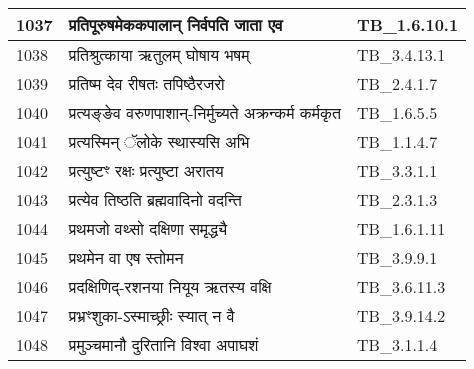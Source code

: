 \documentclass[17pt]{extarticle}
\begin{document}
\begin{longtable}{||p{0.4in}||p{4.9in}||p{0.9in}||}
    \hline
        
    1037 & प्रतिपूरुषमेककपालान् निर्वपति जाता एव & TB\_1.6.10.1       \\
    
    \hline
        
    1038 & प्रतिश्रुत्काया ऋतुलम् घोषाय भषम् & TB\_3.4.13.1       \\
    
    \hline
        
    1039 & प्रतिष्म देव रीषतः तपिष्ठैरजरो & TB\_2.4.1.7       \\
    
    \hline
        
    1040 & प्रत्यङ्ङेव वरुणपाशान्{-}निर्मुच्यते अक्रन्कर्म कर्मकृत & TB\_1.6.5.5       \\
    
    \hline
        
    1041 & प्रत्यस्मिन् ॅलोके स्थास्यसि अभि & TB\_1.1.4.7       \\
    
    \hline
        
    1042 & प्रत्युष्टꣳ रक्षः प्रत्युष्टा अरातय & TB\_3.3.1.1       \\
    
    \hline
        
    1043 & प्रत्येव तिष्ठति ब्रह्मवादिनो वदन्ति & TB\_2.3.1.3       \\
    
    \hline
        
    1044 & प्रथमजो वथ्सो दक्षिणा समृद्ध्यै & TB\_1.6.1.11       \\
    
    \hline
        
    1045 & प्रथमेन वा एष स्तोमन & TB\_3.9.9.1       \\
    
    \hline
        
    1046 & प्रदक्षिणिद्{-}रशनया नियूय ऋतस्य वक्षि & TB\_3.6.11.3       \\
    
    \hline
        
    1047 & प्रभ्रꣳशुका{-}ऽस्माच्छ्रीः स्यात् न वै & TB\_3.9.14.2       \\
    
    \hline
        
    1048 & प्रमुञ्चमानौ दुरितानि विश्वा अपाघशं & TB\_3.1.1.4       \\
    
    \hline
        

\end{longtable}
\end{document}
